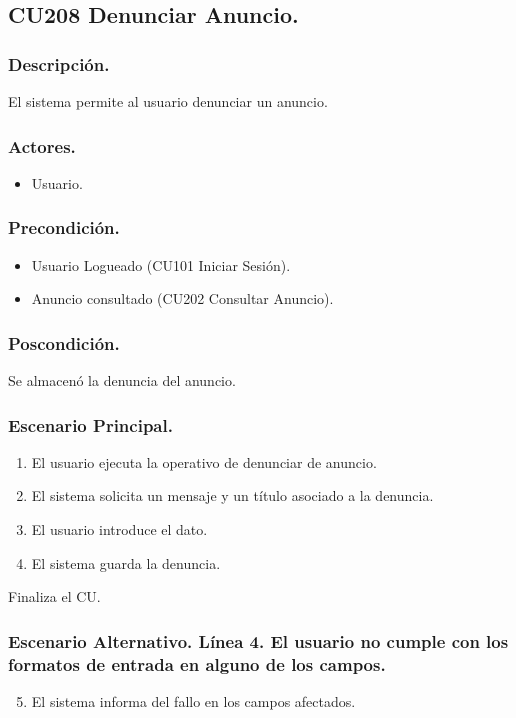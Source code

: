 \subsection{CU208 Denunciar Anuncio.}
\subsubsection{Descripci\'{o}n.}
El sistema permite al usuario denunciar un anuncio.
\subsubsection{Actores.}
\begin{itemize}
\item Usuario.
\end{itemize}
\subsubsection{Precondici\'{o}n.}
\begin{itemize}
\item Usuario Logueado (CU101 Iniciar Sesi\'{o}n).
\item Anuncio consultado (CU202 Consultar Anuncio).
\end{itemize}
\subsubsection{Poscondici\'{o}n.}
Se almacen\'{o} la denuncia del anuncio.
\subsubsection{Escenario Principal.}
\begin{enumerate}
\item El usuario ejecuta la operativo de denunciar de anuncio.
\item El sistema solicita un mensaje y un t\'{i}tulo asociado a la denuncia.
\item El usuario introduce el dato.
\item El sistema guarda la denuncia.
\end{enumerate}
Finaliza el CU.
\subsubsection{Escenario Alternativo. L\'{i}nea 4. El usuario no cumple con los formatos de entrada en alguno de los campos.}
\begin{enumerate}
\setcounter{enumi}{4}
\item El sistema informa del fallo en los campos afectados.
\end{enumerate}


\clearpage\null\newpage

